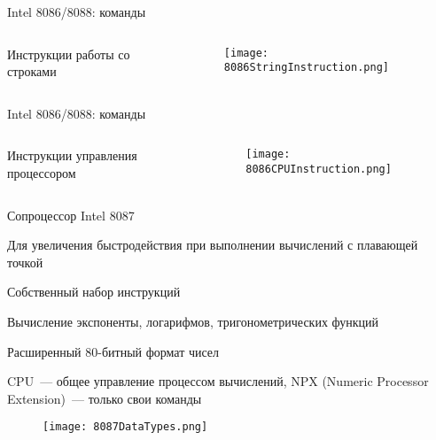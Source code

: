 \documentclass[aspectratio=169,14pt]{beamer}
\begin{document}
\begin{frame}{Intel 8086/8088: команды}
    \begin{columns}[t,onlytextwidth]
        \begin{column}{0.5\textwidth}
            Инструкции работы со строками
        \end{column}
        \begin{column}{0.5\textwidth}
            \begin{figure}[р]
                \centering
                \texttt{[image: 8086StringInstruction.png]}
            \end{figure}
        \end{column}
    \end{columns}
\end{frame}

\begin{frame}{Intel 8086/8088: команды}
    \begin{columns}[t,onlytextwidth]
        \begin{column}{0.5\textwidth}
            Инструкции управления процессором
        \end{column}
        \begin{column}{0.5\textwidth}
            \begin{figure}[р]
                \centering
                \texttt{[image: 8086CPUInstruction.png]}
            \end{figure}
        \end{column}
    \end{columns}
\end{frame}

\begin{frame}{Сопроцессор Intel 8087}
    \begin{itemize}
        \begin{footnotesize}
        \item Для увеличения быстродействия при выполнении вычислений с плавающей точкой
        \item Собственный набор инструкций
        \item Вычисление экспоненты, логарифмов, тригонометрических функций
        \item Расширенный 80-битный формат чисел
        \item CPU~--- общее управление процессом вычислений, NPX (Numeric Processor Extension)~--- только свои команды
        \end{footnotesize}
        \begin{figure}[р]
            \centering
            \texttt{[image: 8087DataTypes.png]}
        \end{figure}
\end{itemize}
\end{frame}
\end{document}
